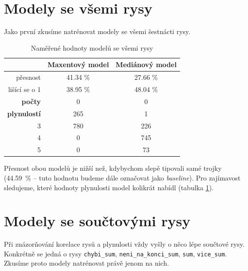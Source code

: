 \documentclass[12pt,a4paper]{report}
\begin{document}


\section{Modely se všemi rysy}
Jako první zkusíme natrénovat modely se všemi šestnácti rysy.

\begin{table}[!htbp]
\begin{center}
\begin{tabular}{|r|c|c|}
\hline
 & \textbf{Maxentový model} & \textbf{Mediánový model} \\
 \hline
přesnost & 41.34 \%  & 27.66 \%  \\
\hline
lišící se o 1 & 38.95 \% & 48.04 \%  \\
\hline
\textbf{počty} \quad 1 & \color{red}0 & \color{red}0 \\
\textbf{plynulostí} \quad 2 & 265 & 1 \\
 3 & 780 & 226 \\
 4 & \color{red}0 & 745 \\
 5 & \color{red}0 & 73 \\
\hline
\end{tabular}
\caption{Naměřené hodnoty modelů se všemi rysy}\label{tb:all}
\end{center}
\end{table}

Přesnost obou modelů je nižší než, kdybychom slepě tipovali samé trojky (44.59~\% -- tuto hodnotu budeme dále označovat jako \textit{baseline}). Pro zajímavost sledujeme, které hodnoty plynulosti model kolikrát nabídl (tabulka \ref{tb:all}).


\section{Modely se součtovými rysy}
Při znázorňování korelace rysů a plynulosti vždy vyšly o něco lépe součtové rysy. Konkrétně se jedná o rysy \texttt{chybi\_sum}, \texttt{neni\_na\_konci\_sum}, \texttt{sum}, \texttt{vice\_sum}. Zkusíme proto modely natrénovat právě jenom na nich. 
\end{document}

